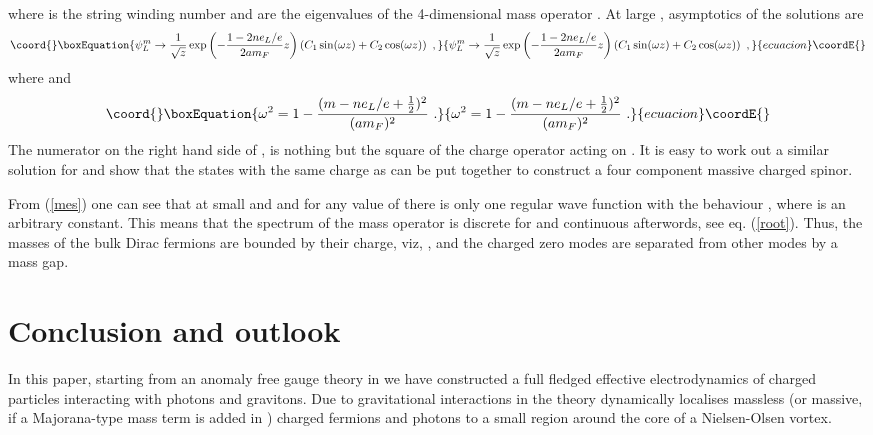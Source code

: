 \documentclass[a4paper,12pt]{article}
\begin{document}
where \coordHE{} is the string winding number and \coordHE{} are the
eigenvalues of the 4-dimensional mass\coordHE{} operator \coordHE{}. At
large
\coordHE{}, asymptotics of the solutions are
\begin{equation}\coord{}\boxEquation{
\psi_L ^{m} \to \frac{1}{\sqrt{z}} \exp
\left(-\frac{1-2ne_L/e}{2am_F}z\right)  \left(C_1 \sin(\omega z) +
C_2 \cos(\omega z)\right)~,
}{
\psi_L ^{m} \to \frac{1}{\sqrt{z}} \exp
\left(-\frac{1-2ne_L/e}{2am_F}z\right)  \left(C_1 \sin(\omega z) +
C_2 \cos(\omega z)\right)~,
}{ecuacion}\coordE{}\end{equation}
where \coordHE{} and
\begin{equation}\coord{}\boxEquation{
\omega^2=1- \frac{(m-ne_L/e+\frac{1}{2})^2}{(am_F)^2} ~.
\label{root}
}{
\omega^2=1- \frac{(m-ne_L/e+\frac{1}{2})^2}{(am_F)^2} ~.
}{ecuacion}\coordE{}\end{equation}
The numerator on the right hand side of \coordHE{}, is nothing but
the square of the charge operator \coordHE{} acting on \coordHE{}. It is easy to work out a similar
solution for \coordHE{} and show that  the states \coordHE{} with the
same charge as \coordHE{}  can be put  together to construct a
four component massive charged spinor.

From (\ref{mes}) one can see that at small \coordHE{} and \coordHE{} and
for any value of \coordHE{} there is only one regular wave function with
the behaviour \coordHE{}, where \coordHE{} is an arbitrary constant. This means that the
spectrum of the mass operator is discrete for \coordHE{} and
continuous afterwords, see eq. (\ref{root}). Thus, the masses of the 
bulk  Dirac fermions  are bounded by their charge, viz,  \coordHE{}, and the charged zero modes are separated from other
modes by a mass gap.

\section{Conclusion and outlook} 
In this paper, starting from an anomaly free \coordHE{} gauge theory in
\coordHE{} we have constructed a full fledged effective \coordHE{}
electrodynamics of charged particles interacting with photons and
gravitons.  Due to gravitational interactions in \coordHE{} the theory
dynamically localises massless (or massive, if a Majorana-type mass
term is added in \coordHE{}) charged fermions and photons to a small
region around the core of a Nielsen-Olsen vortex. 
\end{document}
